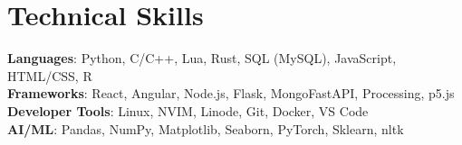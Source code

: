 \documentclass[letterpaper,11pt]{article}
\begin{document}
\section{Technical Skills}
 \begin{itemize}[leftmargin=0.15in, label={}]
    \small{\item{
     \textbf{Languages}{: Python, C/C++, Lua, Rust, SQL (MySQL), JavaScript, HTML/CSS, R} \\
     \textbf{Frameworks}{: React, Angular, Node.js, Flask, MongoFastAPI, Processing, p5.js} \\
     \textbf{Developer Tools}{: Linux, NVIM, Linode, Git, Docker, VS Code} \\
     \textbf{AI/ML}{: Pandas, NumPy, Matplotlib, Seaborn, PyTorch, Sklearn, nltk}
    }}
 \end{itemize}


\end{document}

